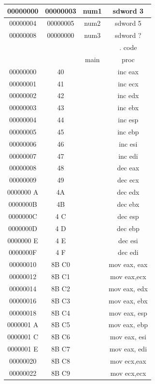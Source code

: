 \documentclass[10pt]{book}
\begin{document}
\begin{center}
\begin{center}
\begin{center}
\begin{center}
\begin{center}
\begin{center}
\begin{tabular}{|c|c|c|c|}
\hline
00000000 & 00000003 & num1 & sdword 3 \\
\hline
00000004 & 00000005 & num2 & sdword 5 \\
\hline
00000008 & 00000000 & num3 & sdword ? \\
\hline
 &  &  & . code \\
\hline
 &  & main & proc \\
\hline
00000000 & 40 &  & inc eax \\
\hline
00000001 & 41 &  & inc ecx \\
\hline
00000002 & 42 &  & inc edx \\
\hline
00000003 & 43 &  & inc ebx \\
\hline
00000004 & 44 &  & inc esp \\
\hline
00000005 & 45 &  & inc ebp \\
\hline
00000006 & 46 &  & inc esi \\
\hline
00000007 & 47 &  & inc edi \\
\hline
00000008 & 48 &  & dec eax \\
\hline
00000009 & 49 &  & dec ecx \\
\hline
0000000 A & 4A &  & dec edx \\
\hline
0000000B & 4B &  & dec ebx \\
\hline
0000000C & 4 C &  & dec esp \\
\hline
0000000D & 4 D &  & dec ebp \\
\hline
0000000 E & 4 E &  & dec esi \\
\hline
0000000F & 4 F &  & dec edi \\
\hline
00000010 & 8B C0 &  & mov eax, eax \\
\hline
00000012 & 8B C1 &  & mov eax,ecx \\
\hline
00000014 & 8B C2 &  & mov eax, edx \\
\hline
00000016 & 8B C3 &  & mov eax, ebx \\
\hline
00000018 & 8B C4 &  & mov eax, esp \\
\hline
0000001 A & 8B C5 &  & mov eax, ebp \\
\hline
0000001 C & 8B C6 &  & mov eax, esi \\
\hline
0000001 E & 8B C7 &  & mov eax, edi \\
\hline
00000020 & 8B C8 &  & mov ecx,eax \\
\hline
00000022 & 8B C9 &  & mov ecx,ecx \\

\end{tabular}
\end{center}
\end{center}
\end{center}
\end{center}
\end{center}
\end{center}
\end{document}
